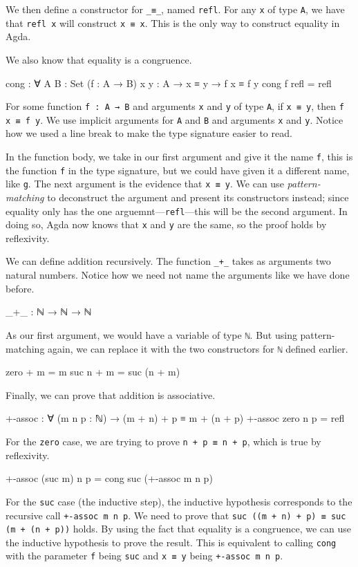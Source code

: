 We then define a constructor for \texttt{\_≡\_}, named \texttt{refl}. For any \texttt{x} of type
\texttt{A}, we have that \texttt{refl x} will construct \texttt{x ≡ x}. This is the only way to
construct equality in Agda.

We also know that equality is a congruence.
\begin{code}
  cong : ∀ {A B : Set} (f : A → B) {x y : A}
    → x ≡ y
    → f x ≡ f y
  cong f refl = refl
\end{code}
For some function \texttt{f : A → B} and arguments \texttt{x} and \texttt{y} of type \texttt{A}, if
\texttt{x ≡ y}, then \texttt{f x ≡ f y}. We use implicit arguments for \texttt{A} and \texttt{B} and
arguments \texttt{x} and \texttt{y}. Notice how we used a line break to make the type signature
easier to read.

In the function body, we take in our first argument and give it the name \texttt{f}, this is the
function \texttt{f} in the type signature, but we could have given it a different name, like
\texttt{g}. The next argument is the evidence that \texttt{x ≡ y}. We can use
\textit{pattern-matching} to deconstruct the argument and present its constructors instead; since
equality only has the one arguemnt---\texttt{refl}---this will be the second argument. In doing so,
Agda now knows that \texttt{x} and \texttt{y} are the same, so the proof holds by reflexivity.

We can define addition recursively. The function \texttt{\_+\_} takes as arguments two natural
numbers. Notice how we need not name the arguments like we have done before.
\begin{code}
  _+_ : ℕ → ℕ → ℕ
\end{code}

As our first argument, we would have a variable of type \texttt{ℕ}. But using pattern-matching
again, we can replace it with the two constructors for \texttt{ℕ} defined earlier.
\begin{code}
  zero  + m = m
  suc n + m = suc (n + m)
\end{code}

Finally, we can prove that addition is associative.
\begin{code}
  +-assoc : ∀ (m n p : ℕ) → (m + n) + p ≡ m + (n + p)
  +-assoc zero    n p = refl
\end{code}
For the \texttt{zero} case, we are trying to prove \texttt{n + p ≡ n + p}, which is true by
reflexivity.
\begin{code}
  +-assoc (suc m) n p = cong suc (+-assoc m n p)
\end{code}
For the \texttt{suc} case (the inductive step), the inductive hypothesis corresponds to the
recursive call \texttt{+-assoc m n p}. We need to prove that \texttt{suc ((m + n) + p) ≡ suc (m + (n
+ p))} holds. By using the fact that equality is a congruence, we can use the inductive hypothesis
to prove the result. This is equivalent to calling \texttt{cong} with the parameter \texttt{f} being
\texttt{suc} and \texttt{x ≡ y} being \texttt{+-assoc m n p}.

